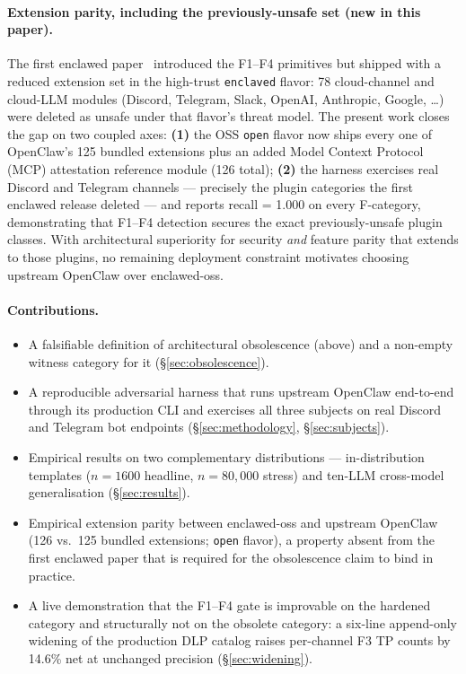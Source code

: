\documentclass[11pt]{article}
\begin{document}
\paragraph{Extension parity, including the previously-unsafe set
(new in this paper).}
The first enclawed paper~\cite{Metere2026enclawed} introduced the
F1--F4 primitives but shipped with a reduced extension set in the
high-trust \texttt{enclaved} flavor: 78 cloud-channel and cloud-LLM
modules (Discord, Telegram, Slack, OpenAI, Anthropic, Google,
\ldots) were deleted as unsafe under that flavor's threat model.
The present work closes the gap on two coupled axes: \textbf{(1)}
the OSS \texttt{open} flavor now ships every one of OpenClaw's 125
bundled extensions plus an added Model Context Protocol (MCP)
attestation reference module
(126 total); \textbf{(2)} the harness exercises real Discord and
Telegram channels --- precisely the plugin categories the first
enclawed release deleted --- and reports recall = 1.000 on every
F-category, demonstrating that F1--F4 detection secures the exact
previously-unsafe plugin classes. With architectural superiority for
security \emph{and} feature parity that extends to those plugins,
no remaining deployment constraint motivates choosing upstream
OpenClaw over enclawed-oss.

\paragraph{Contributions.}
\begin{itemize}
  \item A falsifiable definition of architectural obsolescence
    (above) and a non-empty witness category for it
    (§\ref{sec:obsolescence}).
  \item A reproducible adversarial harness that runs upstream
    OpenClaw end-to-end through its production CLI and exercises
    all three subjects on real Discord and Telegram bot endpoints
    (§\ref{sec:methodology}, §\ref{sec:subjects}).
  \item Empirical results on two complementary distributions ---
    in-distribution templates ($n=1600$ headline, $n=80{,}000$
    stress) and ten-LLM cross-model generalisation
    (§\ref{sec:results}).
  \item Empirical extension parity between enclawed-oss and upstream
    OpenClaw (126 vs.\ 125 bundled extensions; \texttt{open} flavor),
    a property absent from the first enclawed paper that is required
    for the obsolescence claim to bind in practice.
  \item A live demonstration that the F1--F4 gate is improvable on
    the hardened category and structurally not on the obsolete
    category: a six-line append-only widening of the production DLP
    catalog raises per-channel F3 TP counts by 14.6\% net at
    unchanged precision (§\ref{sec:widening}).
\end{itemize}
\end{document}
